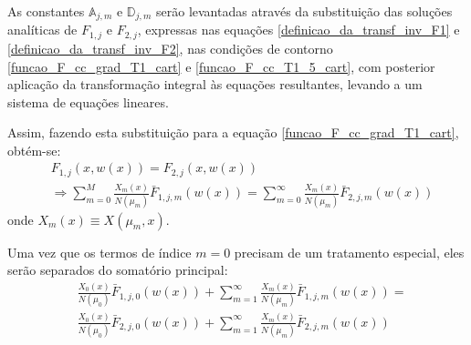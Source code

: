 As constantes $\mathbb{A}_{j,m}$ e $\mathbb{D}_{j,m}$ serão levantadas através da substituição das soluções analíticas de $F_{1,j}$ e $F_{2,j}$, expressas nas equações \eqref{definicao_da_transf_inv_F1} e
\eqref{definicao_da_transf_inv_F2}, nas condições de contorno \eqref{funcao_F_cc_grad_T1_cart} e \eqref{funcao_F_cc_T1_5_cart}, com posterior aplicação da transformação integral às equações resultantes, levando a um sistema de equações lineares.

Assim, fazendo esta
substituição para a equação \eqref{funcao_F_cc_grad_T1_cart}, obtém-se:
\begin{align}
& F_{1,j}(x, w(x)) = F_{2, j}(x, w(x)) \nonumber \\
& \Rightarrow \sum_{m=0}^M \frac{X_m(x)}{N(\mu_m)}\bar{F}_{1,j,m}(w(x)) = \sum_{m=0}^\infty \frac{X_m(x)}{N(\mu_m)}\bar{F}_{2,j,m}(w(x))
\end{align}
onde $X_m(x) \equiv X(\mu_m, x)$.

Uma vez que os termos de índice $m = 0$ precisam de um tratamento especial, eles serão separados do somatório principal:
\begin{align}
& \frac{X_0(x)}{N(\mu_0)}\bar{F}_{1,j,0}(w(x)) +
\sum_{m=1}^\infty \frac{X_m(x)}{N(\mu_m)}\bar{F}_{1,j,m}(w(x))
= \nonumber \\
& \frac{X_0(x)}{N(\mu_0)}\bar{F}_{2,j,0}(w(x)) +
\sum_{m=1}^\infty \frac{X_m(x)}{N(\mu_m)}\bar{F}_{2,j,m}(w(x))
\end{align}

